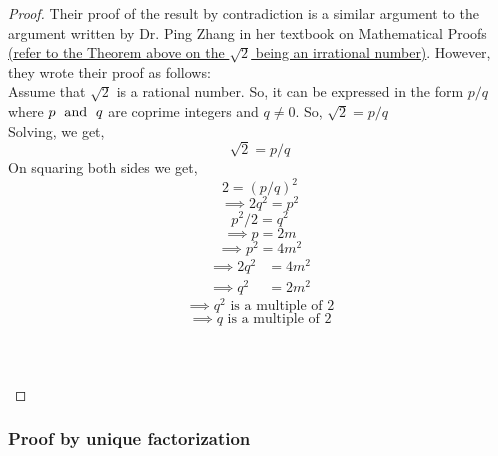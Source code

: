 \documentclass{turabian-researchpaper}
\begin{document}
\begin{proof}
    Their proof of the result by contradiction is a similar argument to the argument written by Dr. Ping Zhang in her textbook on Mathematical Proofs \hyperlink{Ping Zhang's proof}{(refer to the Theorem above on the \(\sqrt{2}\) being an irrational number)}. However, they wrote their proof as follows:
\\
    Assume that \(\sqrt{2}\) is a rational number. So, it can be expressed in the form \(p/q\) where \(p \text{\hspace{.1cm} and \hspace{.1cm}} q\) are coprime integers and \(q \neq 0\). 
    So, \(\sqrt{2} = p/q\) \\
    Solving, we get, \[\sqrt{2} = p/q\] On squaring both sides we get, 
    \begin{equation*}
        2 = (p/q)^2 
    \end{equation*} 
    \begin{equation}
        \implies 2q^2 = p^2  \label{eq:1}
    \end{equation}
    \begin{equation*}
       p^2/2 = q^2  
    \end{equation*}
    \begin{equation*}
        \implies p = 2m 
    \end{equation*}
    \begin{equation}
       \implies p^2 = 4m^2 \label{eq:2}  
    \end{equation}
    \begin{align*}
        \implies 2q^2 &= 4m^2 \\ 
        \implies q^2 &= 2m^2
    \end{align*}
    \[\implies \text{\(q^2\) is a multiple of \(2\)}\]
    \[\implies \text{\(q\) is a multiple of \(2\)}\] \\ 
     \\  \\  
\end{proof} 

\subsubsection{Proof by unique factorization}  
\end{document}
